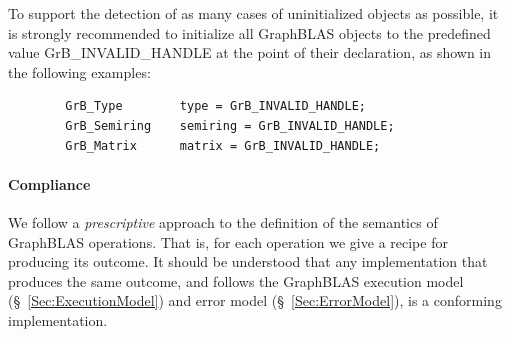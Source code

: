 To support the detection of as many cases of uninitialized objects as possible,
it is strongly recommended to initialize all GraphBLAS objects to
the predefined value {\sf GrB\_INVALID\_HANDLE} at the point of their declaration,
as shown in the following examples:

\begin{verbatim}
        GrB_Type        type = GrB_INVALID_HANDLE;
        GrB_Semiring    semiring = GrB_INVALID_HANDLE;
        GrB_Matrix      matrix = GrB_INVALID_HANDLE;
\end{verbatim}

\paragraph{Compliance}

We follow a \emph{prescriptive} approach to the definition of the semantics
of GraphBLAS operations. That is, for each operation we give a recipe for
producing its outcome.
It should be understood that any implementation that produces the same outcome,
and follows the GraphBLAS execution model (\S~\ref{Sec:ExecutionModel}) and
error model (\S~\ref{Sec:ErrorModel}), is a conforming implementation.
